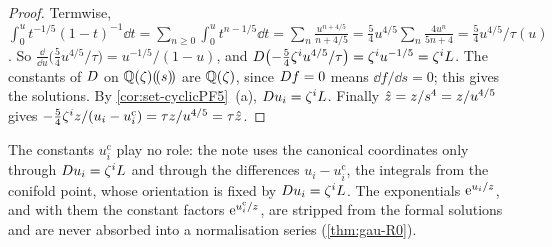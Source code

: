 \begin{proof}
Termwise, $\int_0^ut^{-1/5}(1-t)^{-1}\dd t=\sum_{n\geq0}\int_0^ut^{n-1/5}\dd t=\sum_n\frac{u^{n+4/5}}{n+4/5}=\frac54u^{4/5}\sum_n\frac{4u^n}{5n+4}=\frac54u^{4/5}/\tau(u)$. So $\frac{\dd}{\dd u}\bigl(\frac54u^{4/5}/\tau\bigr)=u^{-1/5}/(1-u)$, and $D\bigl(-\frac54\zeta^iu^{4/5}/\tau\bigr)=\zeta^iu^{-1/5}=\zeta^iL$. The constants of $D$ on $\mathbb{Q}(\zeta)(\!(s)\!)$ are $\mathbb{Q}(\zeta)$, since $D f=0$ means $\dd f/\dd s=0$; this gives the solutions. By \cref{cor:set-cyclicPF5}~(a), $D u_i=\zeta^iL$. Finally $\hat{z}=z/s^4=z/u^{4/5}$ gives $-\frac54\zeta^iz/(u_i-u_i^{\mathrm c})=\tau z/u^{4/5}=\tau\hat{z}$.
\end{proof}

The constants $u_i^{\mathrm c}$ play no role: the note uses the canonical coordinates only through $D u_i=\zeta^iL$ and through the differences $u_i-u_i^{\mathrm c}$, the integrals from the conifold point, whose orientation is fixed by $D u_i=\zeta^iL$. The exponentials $\mathrm{e}^{u_i/z}$, and with them the constant factors $\mathrm{e}^{u_i^{\mathrm c}/z}$, are stripped from the formal solutions and are never absorbed into a normalisation series (\cref{thm:gau-R0}).


